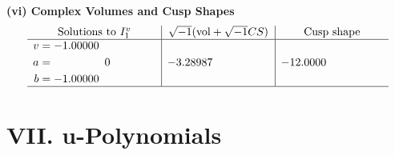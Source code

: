 \documentclass[1p]{elsarticle_modified}
\theoremstyle{definition}
\newcommand{\I}{\sqrt{-1}}
\begin{document}
\newpage\flushleft \textbf{(vi) Complex Volumes and Cusp Shapes}
$$\begin{array}{c|c|c}  
\text{Solutions to }I^v_{1}& \I (\text{vol} + \sqrt{-1}CS) & \text{Cusp shape}\\
 \hline 
\begin{aligned}
v &= -1.00000\phantom{ +0.000000I} \\
a &= \phantom{-0.000000 } 0 \\
b &= -1.00000\phantom{ +0.000000I}\end{aligned}
 & -3.28987\phantom{ +0.000000I} & -12.0000\phantom{ +0.000000I}\\
 \hline 
 \end{array}$$\newpage
\newpage\renewcommand{\arraystretch}{1}
\centering \section*{ VII. u-Polynomials}
\end{document}
